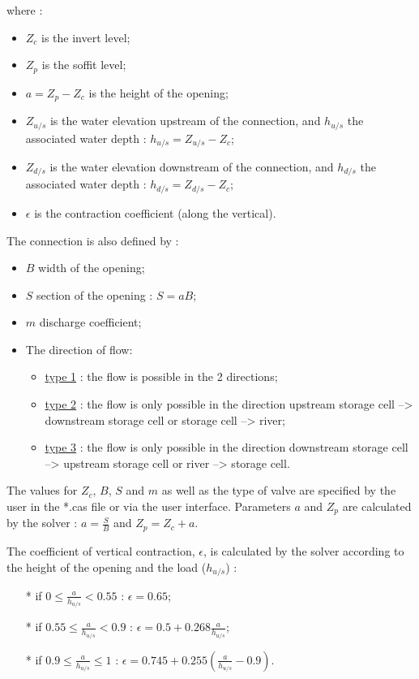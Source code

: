 where :
\begin{itemize}
 \item $Z_c$ is the invert level;
 \item $Z_p$ is the soffit level;
 \item $a=Z_p - Z_c$ is the height of the opening;
 \item $Z_{u/s}$ is the water elevation upstream of the connection, and $h_{u/s}$ the associated water depth : $h_{u/s} = Z_{u/s}-Z_c$;
 \item $Z_{d/s}$ is the water elevation downstream of the connection, and $h_{d/s}$ the associated water depth : $h_{d/s} = Z_{d/s}-Z_c$;
 \item $\epsilon$ is the contraction coefficient (along the vertical).
\end{itemize}

The connection is also defined by :
\begin{itemize}
 \item $B$ width of the opening;
 \item $S$ section of the opening : $S = a B$;
 \item $m$ discharge coefficient;
 \item The direction of flow:
   \begin{itemize}
     \item \underline{type 1} : the flow is possible in the 2 directions;
     \item \underline{type 2} : the flow is only possible in the direction upstream storage cell --> downstream storage cell or storage cell --> river;
     \item \underline{type 3} : the flow is only possible in the direction downstream storage cell --> upstream storage cell or river --> storage cell.
   \end{itemize}
\end{itemize}

The values for $Z_c$, $B$, $S$ and $m$ as well as the type of valve are specified by the user in the *.cas file or via the user interface. Parameters $a$ and $Z_p$ are calculated by the solver : $a = \frac{S}{B}$ and $Z_p = Z_c + a$.

The coefficient of vertical contraction, $\epsilon$, is calculated by the solver according to the height of the opening and the load ($h_{u/s}$) :

\begin{itemize}
 \item[*] if $0 \leq \frac{a}{h_{u/s}} < 0.55$ : $\epsilon = 0.65$;
 \item[*] if $0.55 \leq \frac{a}{h_{u/s}} < 0.9$ : $\epsilon = 0.5 + 0.268 \frac{a}{h_{u/s}}$;
 \item[*] if $0.9 \leq \frac{a}{h_{u/s}} \leq 1$ : $\epsilon = 0.745 + 0.255 \left ( \frac{a}{h_{u/s}} -0.9 \right )$.
\end{itemize}

